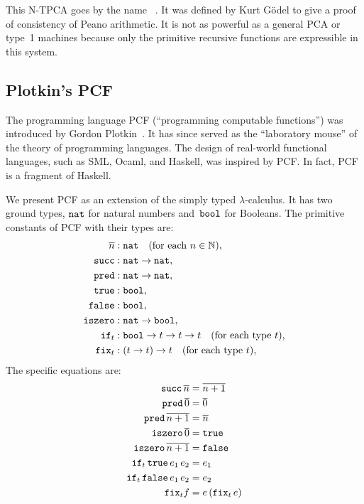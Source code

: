 This N-TPCA goes by the name ~. It was defined by Kurt Gödel to give a
proof of consistency of Peano arithmetic. It is not as powerful as a
general PCA or type~1 machines because only the primitive recursive
functions are expressible in this system.

\subsection{Plotkin's PCF}
\label{sec:pcf}

The programming language PCF (``programming computable functions'')  was introduced by Gordon Plotkin~. It has since
served as the ``laboratory mouse'' of the theory of programming
languages. The design of real-world functional languages, such as SML,
Ocaml, and Haskell, was inspired by PCF. In fact, PCF is a fragment of
Haskell.

We present PCF as an extension of the simply typed $\lambda$-calculus. It has two ground types, $\mathtt{nat}$ for natural numbers and~$\mathtt{bool}$ for Booleans. The primitive constants of PCF with their types are:
%
\begin{align*}
  \overline{n} &: \mathtt{nat} \quad \text{(for each $n \in \mathbb{N}$),} \\
  \mathtt{succ} &: \mathtt{nat} \to \mathtt{nat}, \\
  \mathtt{pred} &: \mathtt{nat} \to \mathtt{nat}, \\
  \mathtt{true} &: \mathtt{bool}, \\
  \mathtt{false} &: \mathtt{bool}, \\
  \mathtt{iszero} &: \mathtt{nat} \to \mathtt{bool}, \\
  \mathtt{if}_t &: \mathtt{bool} \to t \to t \to t \quad\text{(for each type $t$),}\\
  \mathtt{fix}_t &: (t \to t) \to t \quad\text{(for each type $t$),}
\end{align*}
%
The specific equations are:
%
\begin{align*}
  \mathtt{succ} \, \overline{n} &= \overline{n + 1}
  \\
  \mathtt{pred} \, \overline{0} &= \overline{0}
  \\
  \mathtt{pred} \, \overline{n+1} &= \overline{n}
  \\
  \mathtt{iszero} \, \overline{0} &= \mathtt{true}
  \\
  \mathtt{iszero} \, \overline{n+1} &= \mathtt{false}
  \\
  \mathtt{if}_t \, \mathtt{true} \, e_1 \, e_2 &= e_1
  \\
  \mathtt{if}_t \, \mathtt{false} \, e_1 \, e_2 &= e_2
  \\
  \mathtt{fix}_t f &= e \, (\mathtt{fix}_t \, e)
\end{align*}
%

